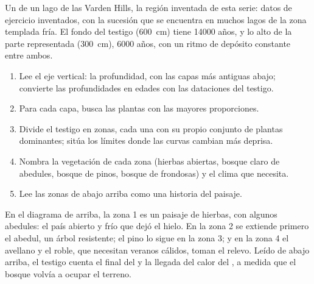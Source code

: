 \begin{omfigure}

{\small Un  de un lago de las Varden Hills, la región inventada
de esta serie: datos de ejercicio inventados, con la sucesión que se encuentra en muchos
lagos de la zona templada fría. El fondo del testigo (\qty{600}{cm}) tiene
\num{14000} años, y lo alto de la parte representada (\qty{300}{cm}), \num{6000} años,
con un ritmo de depósito constante entre ambos.}
\end{omfigure}

\begin{method}
\begin{enumerate}
  \item Lee el eje vertical: la profundidad, con las capas más antiguas abajo;
        convierte las profundidades en edades con las dataciones del testigo.
  \item Para cada capa, busca las plantas con las mayores proporciones.
  \item Divide el testigo en zonas, cada una con su propio conjunto de plantas
        dominantes; sitúa los límites donde las curvas cambian más deprisa.
  \item Nombra la vegetación de cada zona (hierbas abiertas, bosque claro de abedules, bosque
        de pinos, bosque de frondosas) y el clima que necesita.
  \item Lee las zonas de abajo arriba como una historia del paisaje.
\end{enumerate}
\end{method}

En el diagrama de arriba, la zona 1 es un paisaje de hierbas, con algunos abedules: el
país abierto y frío que dejó el hielo. En la zona 2 se extiende primero el abedul, un árbol
resistente; el pino lo sigue en la zona 3; y en la zona 4 el avellano y el roble, que necesitan veranos
cálidos, toman el relevo. Leído de abajo arriba, el testigo cuenta el final del
 y la llegada del calor del , a medida que el
bosque volvía a ocupar el terreno.

